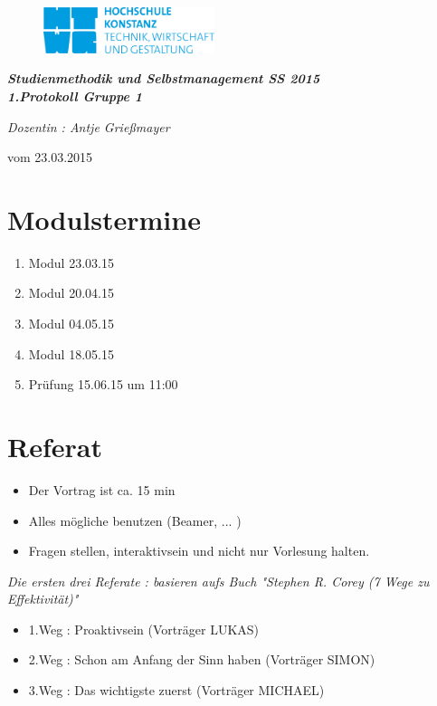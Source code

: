 \documentclass[11pt,a4paper]{article}
\begin{document}
	\begin{figure}
  	\hspace*{-15.0mm} {\includegraphics[width=50mm]{logo}}
  	\end{figure}
  
\hspace{10mm}
\begin{center}

\textit{\textbf{\Huge{ Studienmethodik und Selbstmanagement  SS 2015}}}\\
\emph{\textbf{1.Protokoll Gruppe 1} }
\begin{flushleft}
\textit{ Dozentin :  Antje Grießmayer }
\end{flushleft}

\end{center}
\begin{flushright}
vom 23.03.2015
\end{flushright}
\section*{Modulstermine}
\begin{enumerate}
\item Modul 23.03.15
\item Modul 20.04.15
\item Modul 04.05.15
\item Modul 18.05.15
\item Prüfung 15.06.15 um 11:00
\end{enumerate}

\section*{Referat}
\begin{itemize}
\item Der Vortrag  ist ca. 15 min
\item Alles mögliche benutzen (Beamer, ... )
\item Fragen stellen, interaktivsein und nicht nur Vorlesung halten.  
\end{itemize}
\textit{Die ersten drei Referate : basieren aufs Buch "Stephen R. Corey (7 Wege zu Effektivität)"}
\begin{itemize}
\item 1.Weg : Proaktivsein  (Vorträger LUKAS)
\item 2.Weg : Schon am Anfang der Sinn haben (Vorträger SIMON)
\item 3.Weg : Das wichtigste zuerst (Vorträger MICHAEL)
\end{itemize}
\end{document}
